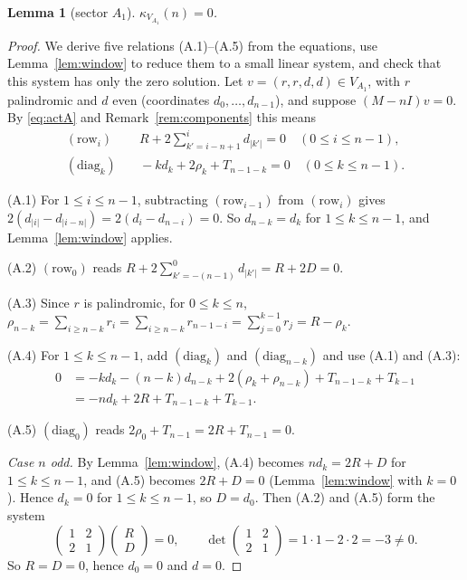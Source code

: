 \documentclass[11pt]{amsart}
\theoremstyle{plain}
\newtheorem{lemma}{Lemma}
\theoremstyle{definition}
\theoremstyle{remark}
\numberwithin{equation}{section}
\newcommand{\abs}[1]{\lvert #1\rvert}
\newcommand{\VA}{V_{A_1}}
\begin{document}
\begin{lemma}[sector \(A_1\)]\label{lem:A1}
\(\kappa_{\VA}(n)=0\).
\end{lemma}

\begin{proof}
We derive five relations (A.1)--(A.5) from the equations, use Lemma~\ref{lem:window} to
reduce them to a small linear system, and check that this system has only the zero
solution. Let \(v=(r,r,d,d)\in\VA\), with \(r\) palindromic and \(d\) even (coordinates
\(d_0,\dots,d_{n-1}\)), and suppose \((M-nI)v=0\). By \eqref{eq:actA} and
Remark~\ref{rem:components} this means
\begin{align*}
(\mathrm{row}_i)&\quad R+2\sum_{k'=i-n+1}^{i}d_{\abs{k'}}=0\quad(0\le i\le n-1),\\
(\mathrm{diag}_k)&\quad -kd_k+2\rho_k+T_{n-1-k}=0\quad(0\le k\le n-1).
\end{align*}

(A.1) For \(1\le i\le n-1\), subtracting \((\mathrm{row}_{i-1})\) from
\((\mathrm{row}_i)\) gives \(2(d_{\abs{i}}-d_{\abs{i-n}})=2(d_i-d_{n-i})=0\). So
\(d_{n-k}=d_k\) for \(1\le k\le n-1\), and Lemma~\ref{lem:window} applies.

(A.2) \((\mathrm{row}_0)\) reads \(R+2\sum_{k'=-(n-1)}^{0}d_{\abs{k'}}=R+2D=0\).

(A.3) Since \(r\) is palindromic, for \(0\le k\le n\),
\(\rho_{n-k}=\sum_{i\ge n-k}r_i=\sum_{i\ge n-k}r_{n-1-i}=\sum_{j=0}^{k-1}r_j=R-\rho_k\).

(A.4) For \(1\le k\le n-1\), add \((\mathrm{diag}_k)\) and \((\mathrm{diag}_{n-k})\) and
use (A.1) and (A.3):
\begin{align*}
0&=-kd_k-(n-k)d_{n-k}+2(\rho_k+\rho_{n-k})+T_{n-1-k}+T_{k-1}\\
&=-nd_k+2R+T_{n-1-k}+T_{k-1}.
\end{align*}

(A.5) \((\mathrm{diag}_0)\) reads \(2\rho_0+T_{n-1}=2R+T_{n-1}=0\).

\emph{Case \(n\) odd.} By Lemma~\ref{lem:window}, (A.4) becomes \(nd_k=2R+D\) for
\(1\le k\le n-1\), and (A.5) becomes \(2R+D=0\) (Lemma~\ref{lem:window} with \(k=0\)).
Hence \(d_k=0\) for \(1\le k\le n-1\), so \(D=d_0\). Then (A.2) and (A.5) form the system
\[
\begin{pmatrix}1&2\\2&1\end{pmatrix}\begin{pmatrix}R\\D\end{pmatrix}=0,\qquad
\det\begin{pmatrix}1&2\\2&1\end{pmatrix}=1\cdot1-2\cdot2=-3\ne0.
\]
So \(R=D=0\), hence \(d_0=0\) and \(d=0\).


\end{proof}
\end{document}
